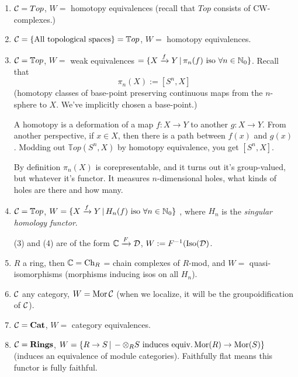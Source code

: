 \documentclass[class=report, crop=false,a4paper,twoside]{standalone}
\begin{document}
	\begin{example}\label{example:weakequi}
		\begin{enumerate}
			\item $\mathcal{C} = Top$, $W =$ homotopy equivalences (recall that $Top$ consists of CW-complexes.)

			\item $\mathcal{C} = \{\text{All topological spaces}\} = \mathbb{T}op$, $W =$ homotopy equivalences. 
			\item\label{item:topologicalweakequi} $\mathcal{C} = \mathbb{T}op$, $W =$ weak equivalences $ = \{X \xrightarrow{f} Y \,|\, \pi_n(f) \text{ iso }\forall n \in \mathbb{N}_0\}$. Recall that
			\[
			\pi_n(X) := [S^n,X]
			\]
			(homotopy classes of base-point preserving continuous maps from the $n$-sphere to $X$. We've implicitly chosen a base-point.)

			A homotopy is a deformation of a map $f: X \to Y$ to another $g: X \to Y$. From another perspective, if $x \in X$, then there is a path between $f(x)$ and $g(x)$. Modding out $\mathbb{T}op(S^n,X)$ by homotopy equivalence, you get $[S^n,X]$. 

			By definition $\pi_n(X)$ is corepresentable, and it turns out it's group-valued, but whatever it's functor. It measures $n$-dimensional holes, what kinds of holes are there and how many.

			\item $\mathcal{C} = \mathbb{T}op$, $W = \{X \xrightarrow{f} Y \,|\, H_n(f) \text{ iso }\forall n \in \mathbb{N}_0\}$
				, where $H_n$ is the \emph{singular homology functor}.
				\begin{remark}
					(3) and (4) are of the form $\mathbb{C} \xrightarrow{F} \mathcal{D}$, $W := F^{-1}(\operatorname{Iso}(\mathcal{D})$.			
				\end{remark}

			\item $R$ a ring, then $\mathbb{C} = \operatorname{Ch}_R$ = chain complexes of $R$-mod, and $W = $ quasi-isomorphisms (morphisms inducing isos on all $H_n$).

			\item $\mathcal{C}$ any category, $W = \operatorname{Mor}\mathcal{C}$ (when we localize, it will be the groupoidification of $\mathcal{C}$). 

			\item $\mathcal{C} = \mathbf{Cat}$, $W = $ category equivalences. 

			\item $\mathcal{C} = \mathbf{Rings}$, $W = \{R \to S \,|\, - \otimes_R S \text{ induces equiv.} \operatorname{Mor}(R) \to \operatorname{Mor}(S)\}$ (induces an equivalence of module categories). Faithfully flat means this functor is fully faithful. 
		\end{enumerate}
	\end{example}
\end{document}
